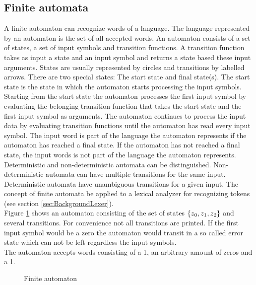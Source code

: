 \subsection{Finite automata}\label{sec:BackgroundAutomata}
A finite automaton can recognize words of a language.
The language represented by an automaton is the set of all accepted words.
An automaton consists of  a set of states, a set of input symbols and transition functions.
A transition function takes as input a state and an input symbol and returns a state based these input arguments.
States are usually represented by circles and transitions by labelled arrows.
There are two special states: The start state and final state(s).
The start state is the state in which the automaton starts processing the input symbols.
Starting from the start state the automaton processes the first input symbol by evaluating the belonging transition function that takes the start state and the first input symbol as arguments. The automaton continues to process the input data by evaluating transition functions until the automaton has read every input symbol. The input word is part of the language the automaton represents if the automaton has reached a final state. If the automaton has not reached a final state, the input words is not part of the language the automaton represents.\\
Deterministic and non-deterministic automata can be distinguished.
Non-deterministic automata can have multiple transitions for the same input.
Deterministic automata have unambiguous transitions for a given input.
The concept of finite automata be applied to a lexical analyzer for recognizing tokens (see section \ref{sec:BackgroundLexer}). \cite{AutomataTheory.2007}\\
Figure \ref{fig:FiniteAutomaton} shows an automaton consisting of the set of states $\{z\textsubscript{0}, z\textsubscript{1}, z\textsubscript{2}\}$ and several transitions. For convenience not all transitions are printed.
If the first input symbol would be a zero the automaton would transit in a so called error state which can not be left regardless the input symbols.\\
The automaton accepts words consisting of a 1, an arbitrary amount of zeros and a 1.

\begin{figure}[H]
\centering
{}
\caption{Finite automaton}
\label{fig:FiniteAutomaton}
\end{figure}

